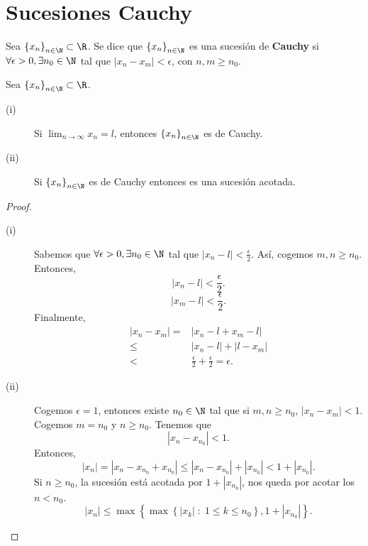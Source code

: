 \section{Sucesiones Cauchy}

\begin{fdefinition}
	\normalfont Sea $\displaystyle \left\{ x_{n}\right\} _{n\in\N}\subset \R $. Se dice que $\displaystyle \left\{ x_{n}\right\} _{n\in\N} $ es una sucesión de \textbf{Cauchy} si $\displaystyle \forall \epsilon > 0, \exists n_{0} \in \N $ tal que $\displaystyle \left|x_{n}-x_{m}\right|<\epsilon  $, con $\displaystyle n,m \geq n_{0} $.
\end{fdefinition}

\begin{fprop}[]
	\normalfont Sea $\displaystyle \left\{ x_{n}\right\} _{n\in\N}\subset\R $. 
\begin{description}
	\item[(i)] Si $\displaystyle \lim_{n \to \infty}x_{n} = l $, entonces $\displaystyle \left\{ x_{n}\right\} _{n\in\N} $ es de Cauchy.
	\item[(ii)] Si $\displaystyle \left\{ x_{n}\right\} _{n\in\N} $ es de Cauchy entonces es una sucesión acotada.
\end{description}
\end{fprop}

\begin{proof}
\begin{description}
\item[(i)] Sabemos que $\displaystyle \forall \epsilon > 0, \exists n_{0} \in \N $  tal que $\displaystyle \left|x_{n}-l\right| < \frac{\epsilon }{2} $. Así, cogemos $\displaystyle m,n \geq n_{0} $. Entonces, 
	\[ \left|x_{n} - l\right|<\frac{\epsilon }{2}.\]
	\[ \left|x_{m}-l\right| < \frac{\epsilon }{2} .\]
Finalmente, 
\[
\begin{split}
	\left|x_{n}-x_{m}\right| = & \left|x_{n}-l+x_{m}-l\right| \\
	\leq & \left|x_{n}-l\right| + \left|l-x_{m}\right| \\
	< & \frac{\epsilon }{2} + \frac{\epsilon }{2} = \epsilon .
\end{split}
\]
\item[(ii)] Cogemos $\displaystyle \epsilon = 1 $, entonces existe $\displaystyle n_{0} \in \N $ tal que si $\displaystyle m,n \geq n_{0} $, $\displaystyle \left|x_{n}-x_{m}\right| < 1 $. Cogemos $\displaystyle m = n_{0} $ y $\displaystyle n\geq n_{0} $. Tenemos que
	\[ \left|x_{n}-x_{n_{0}}\right| < 1 .\]
Entonces, 
\[ \left|x_{n}\right| = \left|x_{n}-x_{n_{0}}+x_{n_{0}}\right| \leq \left|x_{n}-x_{n_{0}}\right| + \left|x_{n_{0}}\right| < 1 + \left|x_{n_{0}}\right| .\]
Si $\displaystyle n\geq n_{0} $, la sucesión está acotada por $\displaystyle 1 + \left|x_{n_{0}}\right| $, nos queda por acotar los $\displaystyle n < n_{0} $. 
\[ \left|x_{n}\right| \leq \max \left\{ \max \left\{ \left|x_{k}\right|\; : \; 1 \leq k\leq n_{0}\right\}, 1 + \left|x_{n_{0}}\right| \right\}  .\]
\end{description}
\end{proof}

